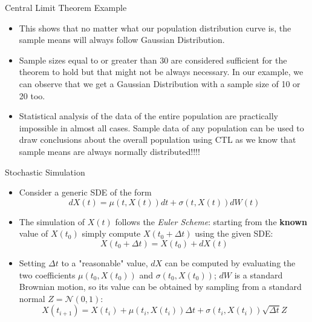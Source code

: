 \documentclass{beamer}
\begin{document}
\begin{frame}{Central Limit Theorem Example}
\begin{itemize}
    \item This shows that no matter what our population distribution curve is, the sample means will always follow Gaussian Distribution.
    \item Sample sizes equal to or greater than 30 are considered sufficient for the theorem to hold but that might not be always necessary. In our example, we can observe that we get a Gaussian Distribution with a sample size of 10 or 20 too.
    \item Statistical analysis of the data of the entire population are practically impossible in almost all cases. Sample data of any population can be used to draw conclusions about the overall population using CTL as we know that sample means are always normally distributed!!!!
\end{itemize}
\end{frame}

\begin{frame}{Stochastic Simulation}
\begin{itemize}
    \item Consider a generic SDE of the form  
        \begin{equation*}
        dX(t) = \mu(t,X(t))dt + \sigma(t,X(t))dW(t) 
        \end{equation*}
    \item The simulation of $X(t)$ follows the \emph{Euler Scheme}: starting from the \textbf{known} value of $X(t_0)$ simply compute $X(t_0 +\Delta t)$ using the given SDE:
        \begin{equation*}
            X(t_0+\Delta t) = X(t_0) + dX(t)
        \end{equation*}
    \item Setting $\Delta t$ to a "reasonable" value, $dX$ can be computed by evaluating the two coefficients $\mu(t_0,X(t_0))$ and $\sigma(t_0,X(t_0))$; $dW$ is a standard Brownian motion, so its value can be obtained by sampling from a standard normal $Z=\mathcal{N}(0,1)$:
        \begin{equation*}
            X(t_{i+1}) = X(t_i) + \mu(t_i,X(t_i))\Delta t + \sigma(t_i,X(t_i))\sqrt{\Delta t}Z 
        \end{equation*}
    \end{itemize}
\end{frame}
\end{document}
